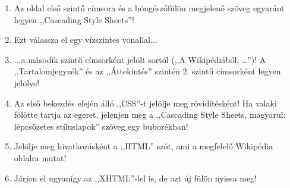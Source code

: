 \begin{frame}
\begin{columns}[c]
\begin{enumerate}
        \item Az oldal első szintű címsora és a böngészőfülön megjelenő szöveg egyaránt legyen ,,Cascading Style Sheets''!
        \item Ezt válassza el egy vízszintes vonallal...
        \item ...a második szintű címsorként jelölt sortól (,,A Wikipédiából, \dots'')! A ,,Tartalomjegyzék'' és az ,,Áttekintés'' szintén 2. szintű címsorként legyen jelölve!
        \item Az első bekezdés elején álló ,,CSS''-t jelölje meg rövidítésként! Ha valaki fölötte tartja az egeret, jelenjen meg a ,,Cascading Style Sheets, magyarul: lépcsőzetes stíluslapok'' szöveg egy buborékban!
        \item Jelölje meg hivatkozásként a ,,HTML'' szót, ami a megfelelő Wikipédia oldalra mutat!
        \item Járjon el ugyanígy az ,,XHTML''-lel is, de azt új fülön nyissa meg!
        \setcounter{feladatSzamlalo}{\theenumi}
      \end{enumerate}
  \end{columns}
\end{frame}

